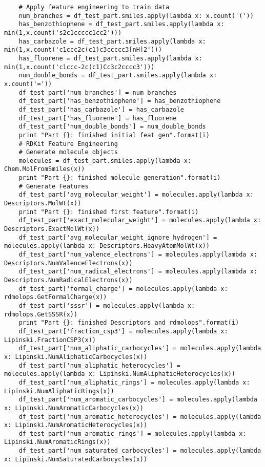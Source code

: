 \documentclass[11pt, oneside]{article}   	%
\begin{document}
\begin{lstlisting}
    # Apply feature engineering to train data
    num_branches = df_test_part.smiles.apply(lambda x: x.count('('))
    has_benzothiophene = df_test_part.smiles.apply(lambda x: min(1,x.count('s2c1ccccc1cc2')))
    has_carbazole = df_test_part.smiles.apply(lambda x: min(1,x.count('c1ccc2c(c1)c3ccccc3[nH]2')))
    has_fluorene = df_test_part.smiles.apply(lambda x: min(1,x.count('c1ccc-2c(c1)Cc3c2cccc3')))
    num_double_bonds = df_test_part.smiles.apply(lambda x: x.count('='))
    df_test_part['num_branches'] = num_branches
    df_test_part['has_benzothiophene'] = has_benzothiophene
    df_test_part['has_carbazole'] = has_carbazole
    df_test_part['has_fluorene'] = has_fluorene
    df_test_part['num_double_bonds'] = num_double_bonds
    print "Part {}: finished initial feat gen".format(i)
    # RDKit Feature Engineering
    # Generate molecule objects
    molecules = df_test_part.smiles.apply(lambda x: Chem.MolFromSmiles(x))
    print "Part {}: finished molecule generation".format(i)
    # Generate Features
    df_test_part['avg_molecular_weight'] = molecules.apply(lambda x: Descriptors.MolWt(x))
    print "Part {}: finished first feature".format(i)
    df_test_part['exact_molecular_weight'] = molecules.apply(lambda x: Descriptors.ExactMolWt(x))
    df_test_part['avg_molecular_weight_ignore_hydrogen'] = molecules.apply(lambda x: Descriptors.HeavyAtomMolWt(x))
    df_test_part['num_valence_electrons'] = molecules.apply(lambda x: Descriptors.NumValenceElectrons(x))
    df_test_part['num_radical_electrons'] = molecules.apply(lambda x: Descriptors.NumRadicalElectrons(x))
    df_test_part['formal_charge'] = molecules.apply(lambda x: rdmolops.GetFormalCharge(x))
    df_test_part['sssr'] = molecules.apply(lambda x: rdmolops.GetSSSR(x))
    print "Part {}: finished Descriptors and rdmolops".format(i)
    df_test_part['fraction_csp3'] = molecules.apply(lambda x: Lipinski.FractionCSP3(x))
    df_test_part['num_aliphatic_carbocycles'] = molecules.apply(lambda x: Lipinski.NumAliphaticCarbocycles(x))
    df_test_part['num_aliphatic_heterocycles'] = molecules.apply(lambda x: Lipinski.NumAliphaticHeterocycles(x))
    df_test_part['num_aliphatic_rings'] = molecules.apply(lambda x: Lipinski.NumAliphaticRings(x))
    df_test_part['num_aromatic_carbocycles'] = molecules.apply(lambda x: Lipinski.NumAromaticCarbocycles(x))
    df_test_part['num_aromatic_heterocycles'] = molecules.apply(lambda x: Lipinski.NumAromaticHeterocycles(x))
    df_test_part['num_aromatic_rings'] = molecules.apply(lambda x: Lipinski.NumAromaticRings(x))
    df_test_part['num_saturated_carbocycles'] = molecules.apply(lambda x: Lipinski.NumSaturatedCarbocycles(x))

\end{lstlisting}
\end{document}
